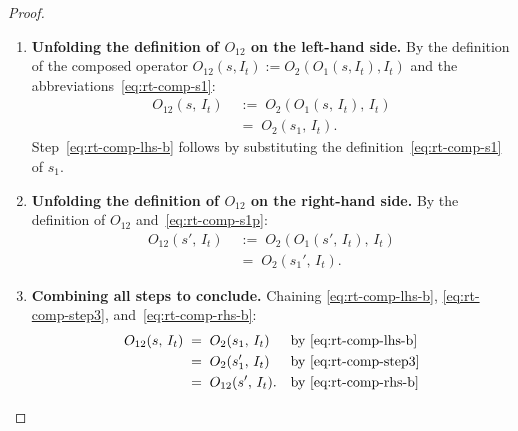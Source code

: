 \documentclass[12pt,openany]{book}
\newcommand{\calI}{\mathcal{I}}
\numberwithin{equation}{chapter}
\theoremstyle{plain}
\theoremstyle{definition}
\theoremstyle{remark}
\numberwithin{equation}{chapter}
\theoremstyle{plain}
\def\calI{I}%
\begin{document}
\begin{proof}
\begin{enumerate}
  \item \textbf{Unfolding the definition of $O_{12}$ on the
        left-hand side.}
        By the definition of the composed operator
        $O_{12}(s, \calI_t) := O_2(O_1(s, \calI_t), \calI_t)$
        and the abbreviations~\eqref{eq:rt-comp-s1}:
        \begin{align}
          O_{12}(s,\, \calI_t)
            &\;:=\; O_2\!\left(O_1(s,\, \calI_t),\, \calI_t\right)
          \label{eq:rt-comp-lhs-a}\\
            &\;=\;   O_2(s_1,\, \calI_t).
          \label{eq:rt-comp-lhs-b}
        \end{align}
        Step~\eqref{eq:rt-comp-lhs-b} follows by substituting the
        definition~\eqref{eq:rt-comp-s1} of $s_1$.

  \item \textbf{Unfolding the definition of $O_{12}$ on the
        right-hand side.}
        By the definition of $O_{12}$ and~\eqref{eq:rt-comp-s1p}:
        \begin{align}
          O_{12}(s',\, \calI_t)
            &\;:=\; O_2\!\left(O_1(s',\, \calI_t),\, \calI_t\right)
          \label{eq:rt-comp-rhs-a}\\
            &\;=\;   O_2(s_1',\, \calI_t).
          \label{eq:rt-comp-rhs-b}
        \end{align}

  \item \textbf{Combining all steps to conclude.}
        Chaining \eqref{eq:rt-comp-lhs-b}, \eqref{eq:rt-comp-step3},
        and~\eqref{eq:rt-comp-rhs-b}:
        \begin{align}
          O_{12}(s,\, \calI_t)
            &\;=\; O_2(s_1,\, \calI_t)
              &&\text{by \eqref{eq:rt-comp-lhs-b}}
          \label{eq:rt-comp-chain1}\\
            &\;=\; O_2(s_1',\, \calI_t)
              &&\text{by \eqref{eq:rt-comp-step3}}
          \label{eq:rt-comp-chain2}\\
            &\;=\; O_{12}(s',\, \calI_t).
              &&\text{by \eqref{eq:rt-comp-rhs-b}}
          \label{eq:rt-comp-conclude}
        \end{align}


\end{enumerate}
\end{proof}
\end{document}
